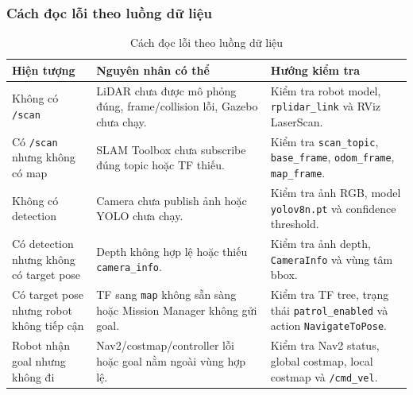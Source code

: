 \subsubsection{Cách đọc lỗi theo luồng dữ liệu}
\label{subsubsec:pipeline-debugging}

\begin{table}[H]
    \centering
    \caption{Cách đọc lỗi theo luồng dữ liệu}
    \label{tab:pipeline-debugging}
    \renewcommand{\arraystretch}{1.25}
    \small
    \begin{tabularx}{\textwidth}{|>{\raggedright\arraybackslash}p{}|>{\raggedright\arraybackslash}p{}|>{\raggedright\arraybackslash}X|}
        \hline
        \textbf{Hiện tượng} & \textbf{Nguyên nhân có thể} & \textbf{Hướng kiểm tra} \\
        \hline
        Không có \texttt{/scan} & LiDAR chưa được mô phỏng đúng, frame/collision lỗi, Gazebo chưa chạy. & Kiểm tra robot model, \texttt{rplidar\_link} và RViz LaserScan. \\
        \hline
        Có \texttt{/scan} nhưng không có map & SLAM Toolbox chưa subscribe đúng topic hoặc TF thiếu. & Kiểm tra \texttt{scan\_topic}, \texttt{base\_frame}, \texttt{odom\_frame}, \texttt{map\_frame}. \\
        \hline
        Không có detection & Camera chưa publish ảnh hoặc YOLO chưa chạy. & Kiểm tra ảnh RGB, model \texttt{yolov8n.pt} và confidence threshold. \\
        \hline
        Có detection nhưng không có target pose & Depth không hợp lệ hoặc thiếu \texttt{camera\_info}. & Kiểm tra ảnh depth, \texttt{CameraInfo} và vùng tâm bbox. \\
        \hline
        Có target pose nhưng robot không tiếp cận & TF sang \texttt{map} không sẵn sàng hoặc Mission Manager không gửi goal. & Kiểm tra TF tree, trạng thái \texttt{patrol\_enabled} và action \texttt{NavigateToPose}. \\
        \hline
        Robot nhận goal nhưng không đi & Nav2/costmap/controller lỗi hoặc goal nằm ngoài vùng hợp lệ. & Kiểm tra Nav2 status, global costmap, local costmap và \texttt{/cmd\_vel}. \\
        \hline
    \end{tabularx}
\end{table}

